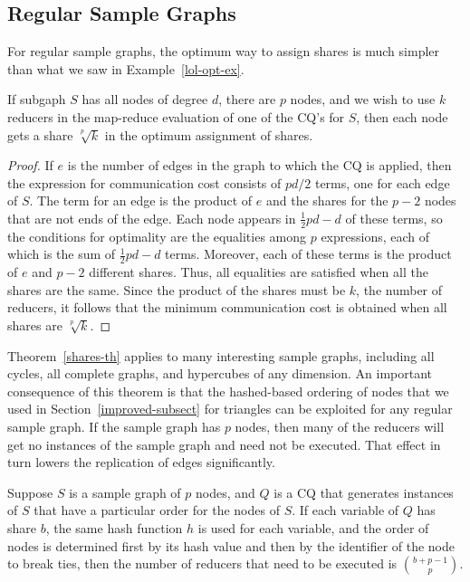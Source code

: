 \subsection{Regular Sample Graphs}
\label{eq-deg-subsect}

For regular sample graphs, the optimum way to assign shares is much simpler than what we saw in Example~\ref{lol-opt-ex}.

\begin{theorem}
\label{shares-th}
If subgaph $S$ has all nodes of degree $d$, there are $p$ nodes, and we wish to use $k$ reducers in the map-reduce evaluation of one of the CQ's for $S$, then each node gets a share $\sqrt[p]{k}$ in the optimum assignment of shares.
\end{theorem}

\begin{proof}
If $e$ is the number of edges in the graph to which the CQ is applied, then the expression for communication cost consists of $pd/2$ terms, one for each edge of $S$.  The term for an edge is the product of $e$ and the shares for the $p-2$ nodes that are not ends of the edge.
Each node appears in $\frac12 pd-d$ of these terms, so the conditions for optimality are the equalities among $p$ expressions, each of which is the sum of $\frac12 pd-d$ terms.  Moreover, each of these terms is the product of $e$ and $p-2$ different shares.
Thus, all equalities are satisfied when all the shares are the same.
Since the product of the shares must be $k$, the number of reducers, it follows that the minimum communication cost is obtained when all shares are $\sqrt[p]{k}$.
\end{proof}

Theorem~\ref{shares-th} applies to many interesting sample graphs,
including all cycles, all complete graphs, and hypercubes of any dimension.
An important consequence of this theorem is that the hashed-based ordering of nodes that we used in Section~\ref{improved-subsect} for triangles can be exploited for any regular sample graph.
If the sample graph has $p$ nodes, then many of the reducers will get no instances of the sample graph and need not be executed.  That effect in turn lowers the replication of edges significantly.

\begin{theorem}
\label{order-buckets-th}
Suppose $S$ is a sample graph of $p$ nodes, and $Q$ is a CQ that generates instances of $S$ that have a particular order for the nodes of $S$.
If each variable of $Q$ has share $b$, the same hash function $h$ is used for each variable, and the order of nodes is determined first by its hash value and then by the identifier of the node to break ties, then the number of reducers that need to be executed is $\binom{b+p-1}{p}$.
\end{theorem}

